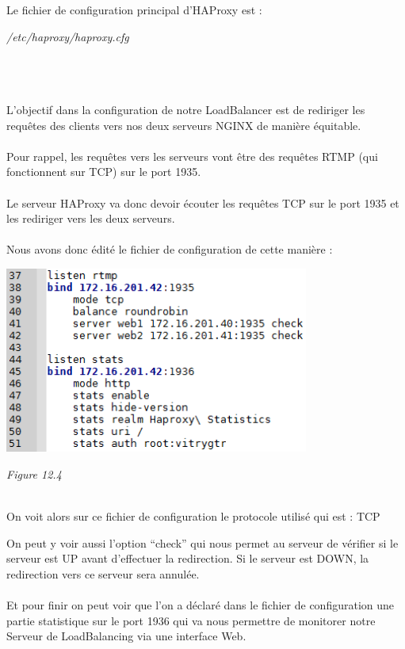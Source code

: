 \documentclass{report}
\begin{document}
    Le fichier de configuration principal d’HAProxy est :\\
    
    \begin{center}
    \textit{/etc/haproxy/haproxy.cfg}
    \end{center}
    \\
    \\
    \\
    L’objectif dans la configuration de notre LoadBalancer est de rediriger les requêtes des clients vers nos deux serveurs NGINX de manière équitable.
    \\
    \\
    Pour rappel, les requêtes vers les serveurs vont être des requêtes RTMP (qui fonctionnent sur TCP)  sur le port 1935.
    \\
    \\
    Le serveur HAProxy va donc devoir écouter les requêtes TCP sur le port 1935 et les rediriger vers les deux serveurs.
    \\
    \\
    Nous avons donc édité le fichier de configuration de cette manière :
    \\

    \begin{center}
    \includegraphics[width=10cm]{img/haproxy.PNG}
    
    \textit{\small{Figure 12.4}}
    \end{center}


    \\
    On voit alors sur ce fichier de configuration le protocole utilisé qui est : TCP
    \\
    \newpage
    
    On peut y voir aussi l’option “check” qui nous permet au serveur de vérifier si le serveur est UP avant d'effectuer la redirection. Si le serveur est DOWN, la redirection vers ce serveur sera annulée.
    \\
    \\
    Et pour finir on peut voir que l'on a déclaré dans le fichier de configuration une partie statistique sur le port 1936 qui va nous permettre de monitorer notre Serveur de LoadBalancing via une interface Web.
    \\
    \\
    
\end{document}
